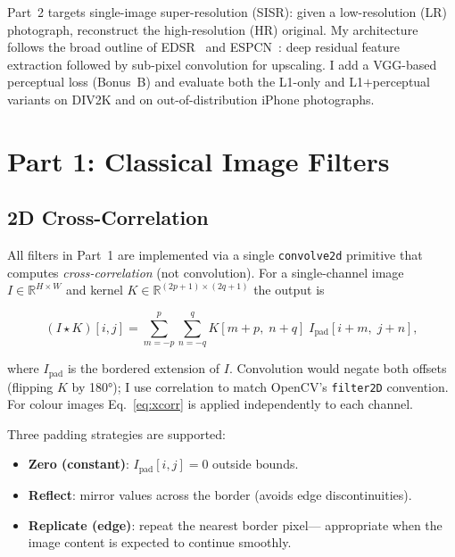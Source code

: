 \documentclass{article}
\begin{document}
Part~2 targets single-image super-resolution (SISR): given a low-resolution
(LR) photograph, reconstruct the high-resolution (HR) original.
My architecture follows the broad outline of EDSR~\cite{lim2017enhanced} and
ESPCN~\cite{shi2016real}: deep residual feature extraction followed by
sub-pixel convolution for upscaling.
I add a VGG-based perceptual loss (Bonus~B) and evaluate both the L1-only and
L1$+$perceptual variants on DIV2K and on out-of-distribution iPhone photographs.

\section{Part 1: Classical Image Filters}

\subsection{2D Cross-Correlation}

All filters in Part~1 are implemented via a single \texttt{convolve2d}
primitive that computes \emph{cross-correlation} (not convolution).
For a single-channel image $I \in \mathbb{R}^{H \times W}$ and kernel
$K \in \mathbb{R}^{(2p+1)\times(2q+1)}$ the output is

\begin{equation}
  (I \star K)[i,j]
  = \sum_{m=-p}^{p} \sum_{n=-q}^{q}
    K[m+p,\; n+q]\; I_{\text{pad}}[i+m,\; j+n],
  \label{eq:xcorr}
\end{equation}

where $I_{\text{pad}}$ is the bordered extension of $I$.
Convolution would negate both offsets (flipping $K$ by 180°); I use
correlation to match OpenCV's \texttt{filter2D} convention.
For colour images Eq.~\eqref{eq:xcorr} is applied independently to each
channel.

Three padding strategies are supported:
\begin{itemize}
  \item \textbf{Zero (constant)}: $I_{\text{pad}}[i,j] = 0$ outside bounds.
  \item \textbf{Reflect}: mirror values across the border (avoids edge
        discontinuities).
  \item \textbf{Replicate (edge)}: repeat the nearest border pixel---
        appropriate when the image content is expected to continue smoothly.
\end{itemize}
\end{document}
